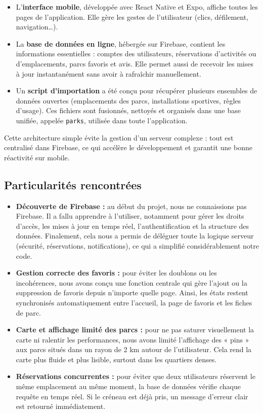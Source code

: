 \documentclass[12pt,a4paper]{article}
\begin{document}
\begin{itemize}
\item L'\textbf{interface mobile}, développée avec React Native et Expo, affiche toutes les pages de l'application. Elle gère les gestes de l'utilisateur (clics, défilement, navigation…).
\item La \textbf{base de données en ligne}, hébergée sur Firebase, contient les informations essentielles : comptes des utilisateurs, réservations d'activités ou d'emplacements, parcs favoris et avis. Elle permet aussi de recevoir les mises à jour instantanément sans avoir à rafraîchir manuellement.

\item Un \textbf{script d'importation} a été conçu pour récupérer plusieurs ensembles de données ouvertes (emplacements des parcs, installations sportives, règles d'usage). Ces fichiers sont fusionnés, nettoyés et organisés dans une base unifiée, appelée \texttt{parks}, utilisée dans toute l'application.
\end{itemize}

Cette architecture simple évite la gestion d'un serveur complexe : tout est centralisé dans Firebase, ce qui accélère le développement et garantit une bonne réactivité sur mobile.

\subsection{Particularités rencontrées}
\begin{itemize}
\item \textbf{Découverte de Firebase :} au début du projet, nous ne connaissions pas Firebase. Il a fallu apprendre à l'utiliser, notamment pour gérer les droits d'accès, les mises à jour en temps réel, l'authentification et la structure des données. Finalement, cela nous a permis de déléguer toute la logique serveur (sécurité, réservations, notifications), ce qui a simplifié considérablement notre code.
\item \textbf{Gestion correcte des favoris :} pour éviter les doublons ou les incohérences, nous avons conçu une fonction centrale qui gère l'ajout ou la suppression de favoris depuis n'importe quelle page. Ainsi, les états restent synchronisés automatiquement entre l'accueil, la page de favoris et les fiches de parc.

\item \textbf{Carte et affichage limité des parcs :} pour ne pas saturer visuellement la carte ni ralentir les performances, nous avons limité l'affichage des « pins » aux parcs situés dans un rayon de 2 km autour de l'utilisateur. Cela rend la carte plus fluide et plus lisible, surtout dans les quartiers denses.

\item \textbf{Réservations concurrentes :} pour éviter que deux utilisateurs réservent le même emplacement au même moment, la base de données vérifie chaque requête en temps réel. Si le créneau est déjà pris, un message d'erreur clair est retourné immédiatement.


\end{itemize}
\end{document}
